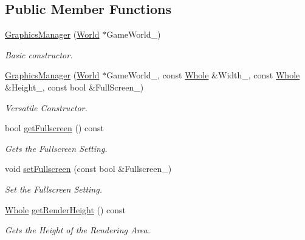 \subsection*{Public Member Functions}
\begin{DoxyCompactItemize}
\item 
\hyperlink{classphys_1_1GraphicsManager_a744d8dc01a75c3a7653f10271c24cb89}{GraphicsManager} (\hyperlink{classphys_1_1World}{World} $\ast$GameWorld\_\-)
\begin{DoxyCompactList}\small\item\em Basic constructor. \item\end{DoxyCompactList}\item 
\hyperlink{classphys_1_1GraphicsManager_ad08d99ea5279fc4aab9615aba536e9cb}{GraphicsManager} (\hyperlink{classphys_1_1World}{World} $\ast$GameWorld\_\-, const \hyperlink{namespacephys_a460f6bc24c8dd347b05e0366ae34f34a}{Whole} \&Width\_\-, const \hyperlink{namespacephys_a460f6bc24c8dd347b05e0366ae34f34a}{Whole} \&Height\_\-, const bool \&FullScreen\_\-)
\begin{DoxyCompactList}\small\item\em Versatile Constructor. \item\end{DoxyCompactList}\item 
bool \hyperlink{classphys_1_1GraphicsManager_ad126eedb81e3f0304731ddd33b617593}{getFullscreen} () const 
\begin{DoxyCompactList}\small\item\em Gets the Fullscreen Setting. \item\end{DoxyCompactList}\item 
void \hyperlink{classphys_1_1GraphicsManager_aafcf1824190e44d42a9bfbea9cfbe1b2}{setFullscreen} (const bool \&Fullscreen\_\-)
\begin{DoxyCompactList}\small\item\em Set the Fullscreen Setting. \item\end{DoxyCompactList}\item 
\hyperlink{namespacephys_a460f6bc24c8dd347b05e0366ae34f34a}{Whole} \hyperlink{classphys_1_1GraphicsManager_a38ee0f8a8a7d8ba861b1c6cfe579443e}{getRenderHeight} () const 
\begin{DoxyCompactList}\small\item\em Gets the Height of the Rendering Area. \item\end{DoxyCompactList}\item 

\end{DoxyCompactItemize}
